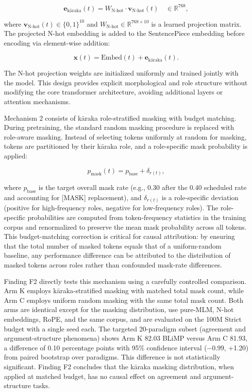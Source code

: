 \begin{equation}
\mathbf{e}_{\text{kāraka}}(t) = W_{\text{N-hot}} \cdot \mathbf{v}_{\text{N-hot}}(t) \quad \in \mathbb{R}^{768},
\end{equation}

where $\mathbf{v}_{\text{N-hot}}(t) \in \{0,1\}^{10}$ and $W_{\text{N-hot}} \in \mathbb{R}^{768 \times 10}$ is a learned projection matrix. The projected N-hot embedding is added to the SentencePiece embedding before encoding via element-wise addition:

\begin{equation}
\mathbf{x}(t) = \text{Embed}(t) + \mathbf{e}_{\text{kāraka}}(t).
\end{equation}

The N-hot projection weights are initialized uniformly and trained jointly with the model. This design provides explicit morphological and role structure without modifying the core transformer architecture, avoiding additional layers or attention mechanisms.

Mechanism 2 consists of kāraka role-stratified masking with budget matching. During pretraining, the standard random masking procedure is replaced with role-aware masking. Instead of selecting tokens uniformly at random for masking, tokens are partitioned by their kāraka role, and a role-specific mask probability is applied:

\begin{equation}
p_{\text{mask}}(t) = p_{\text{base}} + \delta_{r(t)},
\end{equation}

where $p_{\text{base}}$ is the target overall mask rate (e.g., 0.30 after the 0.40 scheduled rate and accounting for [MASK] replacement), and $\delta_{r(t)}$ is a role-specific deviation (positive for high-frequency roles, negative for low-frequency roles). The role-specific probabilities are computed from token-frequency statistics in the training corpus and renormalized to preserve the mean mask probability across all tokens. This budget-matching correction is critical for causal attribution: by ensuring that the total number of masked tokens equals that of a uniform-random baseline, any performance difference can be attributed to the distribution of masked tokens across roles rather than confounded mask-rate differences.

Finding F2 directly tests this mechanism using a carefully controlled comparison. Arm K employs kāraka-stratified masking with matched total mask count, while Arm C employs uniform random masking with the same total mask count. Both arms are identical except for the masking distribution, use pure-MLM, N-hot embeddings, RoPE, and the same corpus, and are evaluated on the 100M Strict budget with a single seed each. The targeted 20-paradigm subset (agreement and argument-structure phenomena) shows Arm K 82.03 BLiMP versus Arm C 81.93, a difference of 0.10 percentage points with 95\% confidence interval (−0.99, +1.20) from paired bootstrap over paradigms. This difference is not statistically significant. Finding F2 concludes that the kāraka masking distribution, when applied at matched budget, has no causal effect on agreement and argument-structure tasks.

